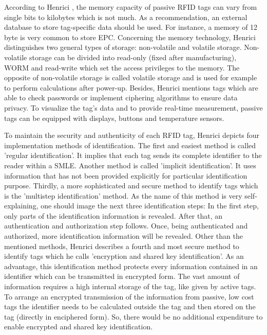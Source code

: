 According to Henrici \cite{henrici}, the memory capacity of passive RFID tags can vary from single bits to kilobytes which is not much. As a recommendation, an external database to store tag-specific data should be used. For instance, a memory of 12 byte is very common to store \ac{EPC}. Concerning the memory technology, Henrici distinguishes two general types of storage: non-volatile and volatile storage. Non-volatile storage can be divided into read-only (fixed after manufacturing), \ac{WORM} and read-write which set the access privileges to the memory. The opposite of non-volatile storage is called volatile storage and is used for example to perform calculations after power-up. Besides, Henrici mentions tags which are able to check passwords or implement ciphering algorithms to ensure data privacy. To visualize the tag's data and to provide real-time measurement, passive tags can be equipped with displays, buttons and temperature sensors. 

To maintain the security and authenticity of each RFID tag, Henrici \cite[p.93 ff.]{henrici} depicts four implementation methods of identification. 
The first and easiest method is called 'regular identification'. It implies that each tag sends its complete identifier to the reader within a \ac{SMLE}. Another method is called 'implicit identification'. It uses information that has not been provided explicitly for particular identification purpose. Thirdly, a more sophisticated and secure method to identify tags which is the 'multistep identification' method. As the name of this method is very self-explaining, one should image the next three identification steps: In the first step, only parts of the identification information is revealed. After that, an authentication and authorization step follows. Once, being authenticated and authorized, more identification information will be revealed. 
Other than the mentioned methods, Henrici describes a fourth and most secure method to identify tags which he calls 'encryption and shared key identification'. As an advantage, this identification method protects every information contained in an identifier which can be transmitted in encrypted form. The vast amount of information requires a high internal storage of the tag, like given by active tags. To arrange an encrypted transmission of the information from passive, low cost tags the identifier needs to be calculated outside the tag and then stored on the tag (directly in enciphered form). So, there would be no additional expenditure to enable encrypted and shared key identification. 

